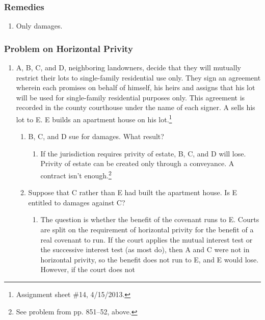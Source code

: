 \subsubsection{Remedies}

\begin{enumerate}
    \item Only damages.
\end{enumerate}

\subsubsection{Problem on Horizontal Privity}

\begin{enumerate}
    \item A, B, C, and D, neighboring landowners, decide that they will 
    mutually restrict their lots to single-family residential use only. They 
    sign an agreement wherein each promises on behalf of himself, his heirs 
    and assigns that his lot will be used for single-family residential 
    purposes only. This agreement is recorded in the county courthouse under 
    the name of each signer. A sells his lot to E. E builds an apartment house 
    on his lot.\footnote{Assignment sheet \#14, 4/15/2013.}
    \begin{enumerate}
        \item B, C, and D sue for damages. What result?
        \begin{enumerate}
            \item If the jurisdiction requires privity of estate, B, C, and D 
            will lose. Privity of estate can be created only through a 
            conveyance. A contract isn't enough.\footnote{See problem from pp. 
            851--52, above.}
        \end{enumerate}
        \item Suppose that C rather than E had built the apartment house. Is E 
        entitled to damages against C?
        \begin{enumerate}
            \item The question is whether the benefit of the covenant runs to 
            E. Courts are split on the requirement of horizontal privity for 
            the benefit of a real covenant to run. If the court applies the 
            mutual interest test or the successive interest test (as most do), 
            then A and C were not in horizontal privity, so the benefit does 
            not run to E, and E would lose. However, if the court does not 

\end{enumerate}
\end{enumerate}
\end{enumerate}
